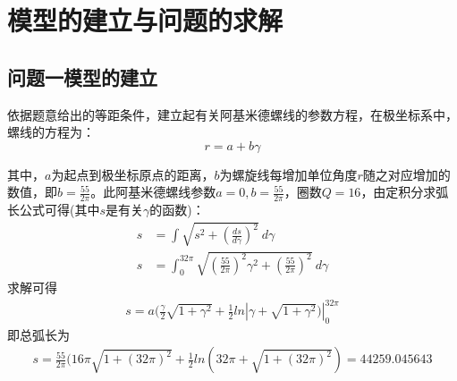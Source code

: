 \documentclass[withoutpreface,bwprint]{cumcmthesis}
\begin{document}
 \newpage
\section{模型的建立与问题的求解}
\subsection{问题一模型的建立}
依据题意给出的等距条件，建立起有关阿基米德螺线的参数方程，在极坐标系中，螺线的方程\cite{ref1}为：
	$$r = a + b\gamma$$
	
其中，$a$为起点到极坐标原点的距离，$b$为螺旋线每增加单位角度$r$随之对应增加的数值，即$b = \frac{55}{2\pi}$。此阿基米德螺线参数$a = 0, b = \frac{55}{2\pi}$，圈数$Q = 16$，由定积分求弧长公式\cite{ref3}可得(其中$s$是有关$\gamma$的函数)：
\begin{align*}
	s &= \int\sqrt{s^2 + (\frac{d s}{d \gamma})^2}\ d\gamma\\
	s &= \int^{32\pi}_0\sqrt{(\frac{55}{2\pi})^2\gamma^2 + (\frac{55}{2\pi})^2}\ d\gamma
\end{align*}
求解可得 
\begin{align*}
	s = a(\frac{\gamma}{2}\sqrt{1+ \gamma^2} + \frac{1}{2}ln|\gamma + \sqrt{1+ \gamma^2})|^{32\pi}_0 
\end{align*}
即总弧长为
\begin{align*}
	s = \frac{55}{2\pi}(16\pi\sqrt{1+(32\pi)^2} + \frac{1}{2}ln(32\pi + \sqrt{1+(32\pi)^2}) = 44259.045643
\end{align*}
\end{document}
